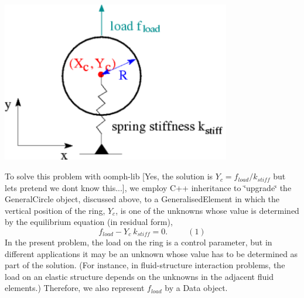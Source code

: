  
\begin{DoxyImage}
\includegraphics[width=0.75\textwidth]{circle_as_element_sketch}
\end{DoxyImage}


To solve this problem with {\ttfamily oomph-\/lib} \mbox{[}Yes, the solution is $ Y_c = f_{load}/k_{stiff}$ but let\textquotesingle{}s pretend we don\textquotesingle{}t know this...\mbox{]}, we employ C++ inheritance to \char`\"{}upgrade\char`\"{} the {\ttfamily General\+Circle} object, discussed above, to a {\ttfamily Generalised\+Element} in which the vertical position of the ring, $ Y_c $, is one of the unknowns whose value is determined by the equilibrium equation (in residual form), \[ f_{load} - Y_c \ k_{stiff} = 0. \ \ \ \ \ \ \ \ \ \ \ (1) \] In the present problem, the load on the ring is a control parameter, but in different applications it may be an unknown whose value has to be determined as part of the solution. (For instance, in fluid-\/structure interaction problems, the load on an elastic structure depends on the unknowns in the adjacent fluid elements.) Therefore, we also represent $ f_{load} $ by a {\ttfamily Data} object.


